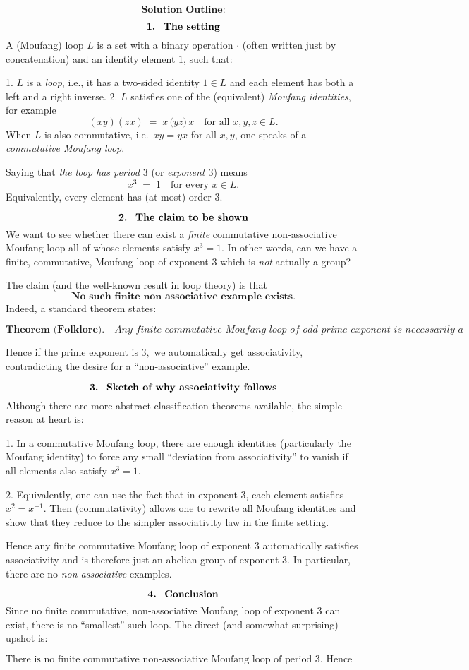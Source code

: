 \documentclass[12p]{article}
\newcounter{answercounter}
\newenvironment{answer}[1][]
{\refstepcounter{answercounter}%
\begin{tcolorbox}[
    title=Answer \theanswercounter: #1,
    colback=white, %
    colframe=gray,
    coltext=black, %
    fonttitle=\bfseries\normalsize,
    top=2mm,
    bottom=2mm,
    enlarge top initially by=5mm
]
\small
}
{\end{tcolorbox}}
\begin{document}
\begin{answer}
\[
\textbf{Solution Outline:}
\]

\[
\textbf{1.\; The setting}
\]
A (Moufang) loop \(L\) is a set with a binary operation \(\cdot\) (often written just by concatenation) and an identity element \(1\), such that:

1. \(L\) is a \emph{loop}, i.e., it has a two‐sided identity \(1\in L\) and each element has both a left and a right inverse.
2. \(L\) satisfies one of the (equivalent) \emph{Moufang identities}, for example
\[
 (x y) (z x) \;=\; x\,\bigl(y z\bigr)\,x 
 \quad
 \text{for all } x,y,z \in L.
\]
When \(L\) is also commutative, i.e.\ \(x y = y x\) for all \(x,y\), one speaks of a \emph{commutative Moufang loop}.

Saying that \emph{the loop has period \(3\)} (or \emph{exponent \(3\)}) means
\[
 x^3 \;=\; 1
 \quad
 \text{for every }x \in L.
\]
Equivalently, every element has (at most) order \(3\).  

\[
\textbf{2.\; The claim to be shown}
\]
We want to see whether there can exist a \emph{finite} commutative non‐associative Moufang loop all of whose elements satisfy \(x^3=1\).  In other words, can we have a finite, commutative, Moufang loop of exponent \(3\) which is \emph{not} actually a group?

The claim (and the well‐known result in loop theory) is that
\[
  \textbf{No such finite non-associative example exists.}
\]
Indeed, a standard theorem states:

\[
 \textbf{Theorem (Folklore).} \quad
 \textit{Any finite commutative Moufang loop of odd prime exponent is necessarily a (commutative) group.}
\]

Hence if the prime exponent is \(3,\) we automatically get associativity, contradicting the desire for a “non‐associative” example.

\[
\textbf{3.\; Sketch of why associativity follows}
\]
Although there are more abstract classification theorems available, the simple reason at heart is:

1. In a commutative Moufang loop, there are enough identities (particularly the Moufang identity) to force any small “deviation from associativity” to vanish if all elements also satisfy \(x^3=1\).  

2. Equivalently, one can use the fact that in exponent \(3\), each element satisfies \(x^2 = x^{-1}\).  Then (commutativity) allows one to rewrite all Moufang identities and show that they reduce to the simpler associativity law in the finite setting.

Hence any finite commutative Moufang loop of exponent \(3\) automatically satisfies associativity and is therefore just an abelian group of exponent \(3\). In particular, there are no \emph{non‐associative} examples.

\[
\textbf{4.\; Conclusion}
\]
Since no finite commutative, non‐associative Moufang loop of exponent \(3\) can exist, there is no “smallest” such loop.  The direct (and somewhat surprising) upshot is:

\[
\boxed{
\text{There is no finite commutative non-associative Moufang loop of period 3. Hence no minimal example exists.}
}
\]
\end{answer}
\end{document}
